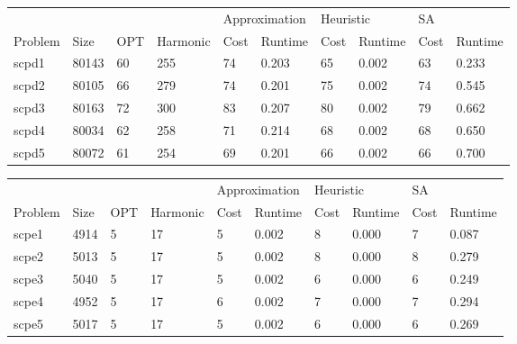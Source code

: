 \begin{table}[]
\centering
\begin{tabular}{@{}llllllllll@{}}
\toprule
        &       &     &          & \multicolumn{2}{l}{Approximation} & \multicolumn{2}{l}{Heuristic} & \multicolumn{2}{l}{SA} \\
Problem & Size  & OPT & Harmonic & Cost           & Runtime          & Cost         & Runtime        & Cost     & Runtime     \\ \midrule
scpd1   & 80143 & 60  & 255      & 74             & 0.203            & 65           & 0.002          & 63       & 0.233       \\
scpd2   & 80105 & 66  & 279      & 74             & 0.201            & 75           & 0.002          & 74       & 0.545       \\
scpd3   & 80163 & 72  & 300      & 83             & 0.207            & 80           & 0.002          & 79       & 0.662       \\
scpd4   & 80034 & 62  & 258      & 71             & 0.214            & 68           & 0.002          & 68       & 0.650       \\
scpd5   & 80072 & 61  & 254      & 69             & 0.201            & 66           & 0.002          & 66       & 0.700       \\ \bottomrule
\end{tabular}
\end{table}

\begin{table}[]
\centering
\begin{tabular}{@{}llllllllll@{}}
\toprule
        &      &     &          & \multicolumn{2}{l}{Approximation} & \multicolumn{2}{l}{Heuristic} & \multicolumn{2}{l}{SA} \\
Problem & Size & OPT & Harmonic & Cost           & Runtime          & Cost         & Runtime        & Cost     & Runtime     \\ \midrule
scpe1   & 4914 & 5   & 17       & 5              & 0.002            & 8            & 0.000          & 7        & 0.087       \\
scpe2   & 5013 & 5   & 17       & 5              & 0.002            & 8            & 0.000          & 8        & 0.279       \\
scpe3   & 5040 & 5   & 17       & 5              & 0.002            & 6            & 0.000          & 6        & 0.249       \\
scpe4   & 4952 & 5   & 17       & 6              & 0.002            & 7            & 0.000          & 7        & 0.294       \\
scpe5   & 5017 & 5   & 17       & 5              & 0.002            & 6            & 0.000          & 6        & 0.269       \\ \bottomrule
\end{tabular}
\end{table}

